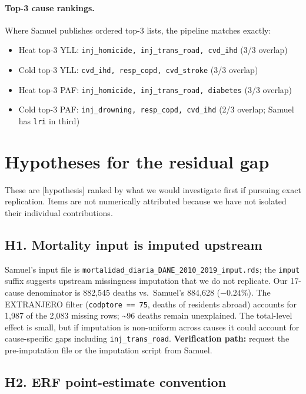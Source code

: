 \documentclass[11pt]{article}
\newcommand{\guess}[0]{\textcolor{orange!80!black}{[hypothesis]}}
\begin{document}
\paragraph{Top-3 cause rankings.} Where Samuel publishes ordered top-3 lists,
the pipeline matches exactly:
\begin{itemize}[itemsep=2pt]
  \item Heat top-3 YLL: \texttt{inj\_homicide, inj\_trans\_road, cvd\_ihd} (3/3 overlap)
  \item Cold top-3 YLL: \texttt{cvd\_ihd, resp\_copd, cvd\_stroke} (3/3 overlap)
  \item Heat top-3 PAF: \texttt{inj\_homicide, inj\_trans\_road, diabetes} (3/3 overlap)
  \item Cold top-3 PAF: \texttt{inj\_drowning, resp\_copd, cvd\_ihd} (2/3 overlap;
    Samuel has \texttt{lri} in third)
\end{itemize}

\section{Hypotheses for the residual gap}
\label{sec:hypotheses}

These are \guess{} ranked by what we would investigate first if pursuing
exact replication. Items are not numerically attributed because we have not
isolated their individual contributions.

\subsection*{H1. Mortality input is imputed upstream}

Samuel's input file is \texttt{mortalidad\_diaria\_DANE\_2010\_2019\_imput.rds};
the \texttt{imput} suffix suggests upstream missingness imputation that we
do not replicate. Our 17-cause denominator is 882{,}545 deaths vs.\ Samuel's
884{,}628 ($-0.24\%$). The EXTRANJERO filter (\texttt{codptore == 75}, deaths
of residents abroad) accounts for 1{,}987 of the 2{,}083 missing rows;
\textasciitilde 96 deaths remain unexplained. The total-level effect is small,
but if imputation is non-uniform across causes it could account for
cause-specific gaps including \texttt{inj\_trans\_road}.
\textbf{Verification path:} request the pre-imputation file or the
imputation script from Samuel.

\subsection*{H2. ERF point-estimate convention}
\end{document}
